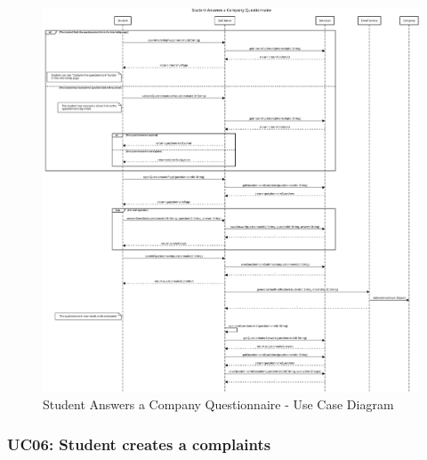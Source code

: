 \begin{figure}[H]
    \centering
    \includegraphics[width=1.0\textwidth]{Images/UC_5.pdf}
    \caption{Student Answers a Company Questionnaire - Use Case Diagram}
    \label{fig:use-case-diagram-5}
\end{figure}


\subsubsection{UC06: Student creates a complaints}
\label{subsubsec:student-creates-a-complaints}

